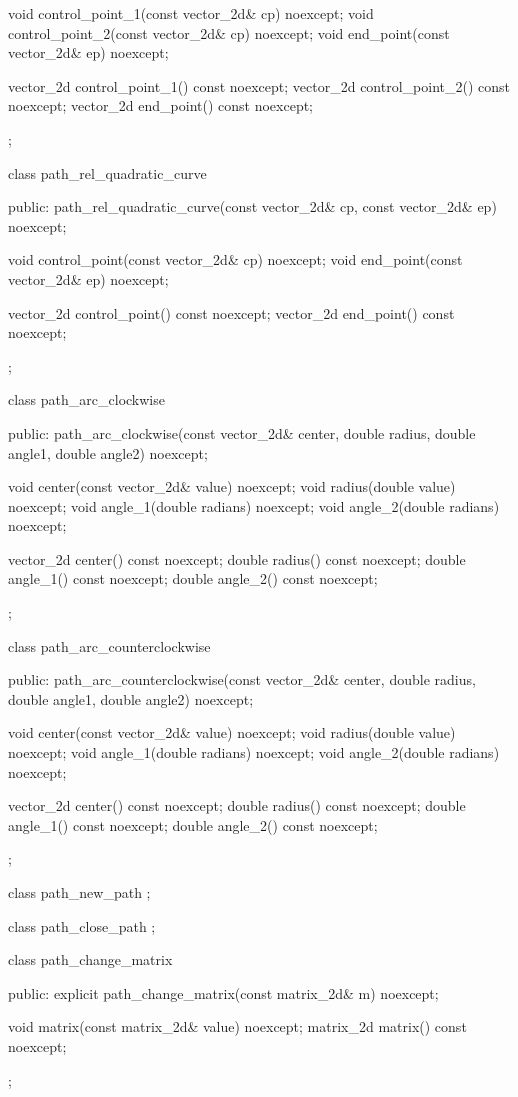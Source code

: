 \begin{codeblock}
{{{{{{      void control_point_1(const vector_2d& cp) noexcept;
      void control_point_2(const vector_2d& cp) noexcept;
      void end_point(const vector_2d& ep) noexcept;
    
      vector_2d control_point_1() const noexcept;
      vector_2d control_point_2() const noexcept;
      vector_2d end_point() const noexcept;
    };
    
    class path_rel_quadratic_curve {
    public:
      path_rel_quadratic_curve(const vector_2d& cp, const vector_2d& ep)
        noexcept;
    
      void control_point(const vector_2d& cp) noexcept;
      void end_point(const vector_2d& ep) noexcept;
    
      vector_2d control_point() const noexcept;
      vector_2d end_point() const noexcept;
    };
    
    class path_arc_clockwise {
    public:
      path_arc_clockwise(const vector_2d& center, double radius, double angle1, double angle2) noexcept;
      
      void center(const vector_2d& value) noexcept;
      void radius(double value) noexcept;
      void angle_1(double radians) noexcept;
      void angle_2(double radians) noexcept;
      
      vector_2d center() const noexcept;
      double radius() const noexcept;
      double angle_1() const noexcept;
      double angle_2() const noexcept;
    };
    
    class path_arc_counterclockwise {
    public:
      path_arc_counterclockwise(const vector_2d& center, double radius, double angle1, double angle2) noexcept;
      
      void center(const vector_2d& value) noexcept;
      void radius(double value) noexcept;
      void angle_1(double radians) noexcept;
      void angle_2(double radians) noexcept;
      
      vector_2d center() const noexcept;
      double radius() const noexcept;
      double angle_1() const noexcept;
      double angle_2() const noexcept;
    };
    
    class path_new_path {
    };
    
    class path_close_path {
    };
    
    class path_change_matrix {
    public:
      explicit path_change_matrix(const matrix_2d& m) noexcept;
      
      void matrix(const matrix_2d& value) noexcept;
      matrix_2d matrix() const noexcept;
    };
    
}}}}}
\end{codeblock}
